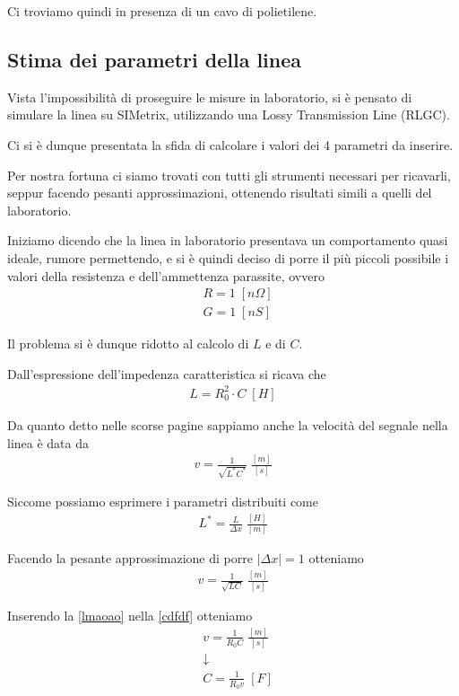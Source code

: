 \documentclass[]{report}
\newcommand{\firstpassage}{ \\ &\downarrow \nonumber \\}
\begin{document}
Ci troviamo quindi in presenza di un cavo di polietilene.

\subsection{Stima dei parametri della linea}

Vista l'impossibilità di proseguire le misure in laboratorio, si è pensato di simulare la linea su SIMetrix, utilizzando una Lossy Transmission Line (RLGC).

Ci si è dunque presentata la sfida di calcolare i valori dei 4 parametri da inserire.

Per nostra fortuna ci siamo trovati con tutti gli strumenti necessari per ricavarli, seppur facendo pesanti approssimazioni, ottenendo risultati simili a quelli del laboratorio.

Iniziamo dicendo che la linea in laboratorio presentava un comportamento quasi ideale, rumore permettendo, e si è quindi deciso di porre il più piccoli possibile i valori della resistenza e dell'ammettenza parassite, ovvero
\begin{align}
&R = 1 \; [n\Omega]\\
&G = 1 \; [nS]
\end{align}

\newpage

Il problema si è dunque ridotto al calcolo di $L$ e di $C$.

Dall'espressione dell'impedenza caratteristica si ricava che
\begin{align}
L= R_0^2\cdot C  \; [H]\label{lmaoao}
\end{align}

Da quanto detto nelle scorse pagine sappiamo anche la velocità del segnale nella linea è data da
\begin{align}
v = \frac{1}{\sqrt{L^*C^*}} \; \frac{[m]}{[s]}
\end{align}

Siccome possiamo esprimere i parametri distribuiti come
\begin{align}
L^* = \frac{L}{\Delta x}  \; \frac{[H]}{[m]}
\end{align}

Facendo la pesante approssimazione di porre $|\Delta x|=1$ otteniamo
\begin{align}
v = \frac{1}{\sqrt{LC}} \label{cdfdf}  \; \frac{[m]}{[s]}
\end{align}

Inserendo la \ref{lmaoao} nella \ref{cdfdf} otteniamo
\begin{align}
&v = \frac{1}{R_0 C} \; \frac{[m]}{[s]} \firstpassage
&C = \frac{1}{R_0 v} \; [F]
\end{align}
\end{document}
